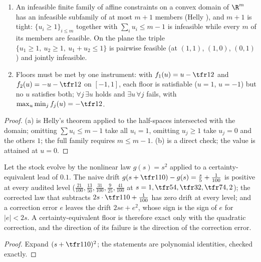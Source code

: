 \begin{proposition}\label{prop:helly}
\begin{enumerate}[label=(\alph*),leftmargin=2em,itemsep=1pt]
\item An infeasible finite family of affine constraints on a convex domain of $\R^m$ has an infeasible subfamily of at most $m+1$ members (Helly \cite{Helly1923}), and $m+1$ is tight: $\{u_i\ge 1\}_{i\le m}$ together with $\sum_i u_i\le m-1$ is infeasible while every $m$ of its members are feasible. On the plane the triple $\{u_1\ge 1,\ u_2\ge 1,\ u_1+u_2\le 1\}$ is pairwise feasible (at $(1,1)$, $(1,0)$, $(0,1)$) and jointly infeasible.
\item Floors must be met by one instrument: with $f_1(u)=u-\tfr12$ and $f_2(u)=-u-\tfr12$ on $[-1,1]$, each floor is satisfiable ($u=1$, $u=-1$) but no $u$ satisfies both; $\forall j\,\exists u$ holds and $\exists u\,\forall j$ fails, with $\max_u\min_j f_j(u)=-\tfr12$.
\end{enumerate}
\end{proposition}

\begin{proof}
(a) is Helly's theorem applied to the half-spaces intersected with the domain; omitting $\sum u_i\le m-1$ take all $u_i=1$, omitting $u_j\ge 1$ take $u_j=0$ and the others $1$; the full family requires $m\le m-1$. (b) is a direct check; the value is attained at $u=0$.
\end{proof}

\begin{proposition}\label{prop:drift}
Let the stock evolve by the nonlinear law $g(s)=s^2$ applied to a certainty-equivalent lead of $0.1$. The naive drift $g(s+\tfr1{10})-g(s)=\tfrac{s}{5}+\tfrac1{100}$ is positive at every audited level ($\tfrac{21}{100},\tfrac{13}{50},\tfrac{31}{100},\tfrac{9}{25},\tfrac{41}{100}$ at $s=1,\tfr54,\tfr32,\tfr74,2$); the corrected law that subtracts $2s\cdot\tfr1{10}+\tfrac1{100}$ has zero drift at every level; and a correction error $e$ leaves the drift $2se+e^2$, whose sign is the sign of $e$ for $|e|<2s$. A certainty-equivalent floor is therefore exact only with the quadratic correction, and the direction of its failure is the direction of the correction error.
\end{proposition}

\begin{proof}
Expand $(s+\tfr1{10})^2$; the statements are polynomial identities, checked exactly.
\end{proof}

